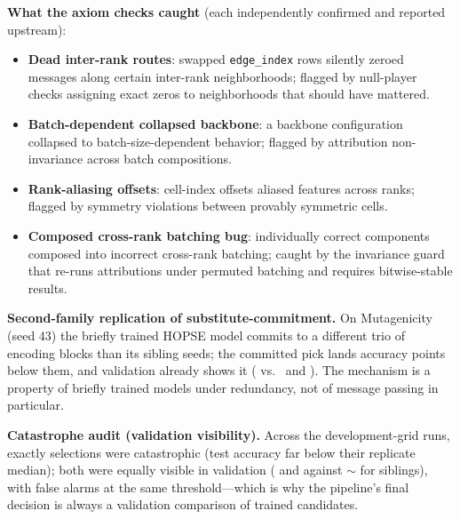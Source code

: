 \textbf{What the axiom checks caught} (each independently confirmed and
reported upstream):
\begin{itemize}
  \item \textbf{Dead inter-rank routes}: swapped \texttt{edge\_index}
    rows silently zeroed messages along certain inter-rank
    neighborhoods; flagged by null-player checks assigning exact zeros
    to neighborhoods that should have mattered.
  \item \textbf{Batch-dependent collapsed backbone}: a backbone
    configuration collapsed to batch-size-dependent behavior; flagged
    by attribution non-invariance across batch compositions.
  \item \textbf{Rank-aliasing offsets}: cell-index offsets aliased
    features across ranks; flagged by symmetry violations between
    provably symmetric cells.
  \item \textbf{Composed cross-rank batching bug}: individually correct
    components composed into incorrect cross-rank batching; caught by
    the invariance guard that re-runs attributions under permuted
    batching and requires bitwise-stable results.
\end{itemize}

\textbf{Second-family replication of substitute-commitment.} On
Mutagenicity (seed 43) the briefly trained HOPSE model commits to a
different trio of
encoding blocks than its sibling seeds; the committed pick lands
\unfrozen{\ResHopseCommitDropPts} accuracy points below them, and
validation already shows it (\unfrozen{\ResHopseCommitValBad} vs.\
\unfrozen{\ResHopseCommitValSibA} and
\unfrozen{\ResHopseCommitValSibB}). The mechanism is a property of
briefly trained models under redundancy, not of message passing in
particular.

\textbf{Catastrophe audit (validation visibility).} Across the
\unfrozen{\ResCatastropheCells} development-grid runs, exactly
\unfrozen{\ResCatastropheCount} selections were catastrophic (test
accuracy far below their replicate median); both were equally visible
in validation (\unfrozen{\ResCatastropheValA} and
\unfrozen{\ResCatastropheValB} against
$\sim$\unfrozen{\ResCatastropheSiblingVal} for siblings), with
\unfrozen{\ResCatastropheFalseAlarms} false alarms at the same
threshold---which is why the pipeline's final decision is always a
validation comparison of trained candidates.

